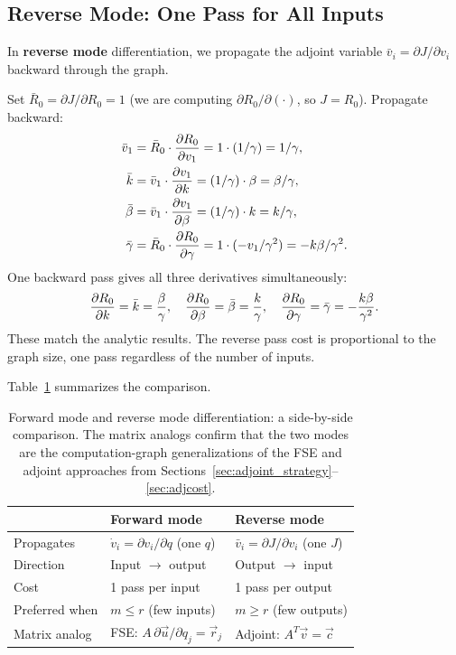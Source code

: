 \subsection{Reverse Mode: One Pass for All Inputs}

In \textbf{reverse mode} differentiation, we propagate the adjoint
variable $\bar{v}_i = \partial J/\partial v_i$ backward through
the graph.

Set $\bar{R}_0 = \partial J/\partial R_0 = 1$ (we are computing
$\partial R_0/\partial(\cdot)$, so $J = R_0$).
Propagate backward:
\begin{align}
  \bar{v}_1   &= \bar{R}_0 \cdot \frac{\partial R_0}{\partial v_1} = 1 \cdot (1/\gamma) = 1/\gamma,
               \label{eq:rev1}\\
  \bar{k}     &= \bar{v}_1 \cdot \frac{\partial v_1}{\partial k}   = (1/\gamma)\cdot\beta = \beta/\gamma,
               \label{eq:rev2}\\
  \bar{\beta}  &= \bar{v}_1 \cdot \frac{\partial v_1}{\partial \beta} = (1/\gamma)\cdot k = k/\gamma,
               \label{eq:rev3}\\
  \bar{\gamma} &= \bar{R}_0 \cdot \frac{\partial R_0}{\partial \gamma} = 1\cdot(-v_1/\gamma^2)
                = -k\beta/\gamma^2.
               \label{eq:rev4}
\end{align}
One backward pass gives all three derivatives simultaneously:
\[
  \frac{\partial R_0}{\partial k} = \bar{k} = \frac{\beta}{\gamma}, \quad
  \frac{\partial R_0}{\partial \beta} = \bar{\beta} = \frac{k}{\gamma}, \quad
  \frac{\partial R_0}{\partial \gamma} = \bar{\gamma} = -\frac{k\beta}{\gamma^2}.
\]
These match the analytic results. The reverse pass cost is
proportional to the graph size, one pass regardless of the
number of inputs.

Table~\ref{tab:fwdrev} summarizes the comparison.

\begin{table}[htb]
\centering
\begin{tabular}{lll}
\toprule
 & Forward mode & Reverse mode \\
\midrule
Propagates       & $\dot{v}_i = \partial v_i/\partial q$ (one $q$) &
                   $\bar{v}_i = \partial J/\partial v_i$ (one $J$) \\
Direction        & Input $\to$ output & Output $\to$ input \\
Cost             & 1 pass per input & 1 pass per output \\
Preferred when   & $m \leq r$ (few inputs) & $m \geq r$ (few outputs) \\
Matrix analog    & FSE: $A\,\partial\vec{u}/\partial q_j = \vec{r}_j$ &
                   Adjoint: $A^T\vec{v} = \vec{c}$ \\
\bottomrule
\end{tabular}
\caption{Forward mode and reverse mode differentiation:
         a side-by-side comparison.
         The matrix analogs confirm that the two modes are
         the computation-graph generalizations of the FSE and
         adjoint approaches from Sections~\ref{sec:adjoint_strategy}--\ref{sec:adjcost}.}
\label{tab:fwdrev}
\end{table}

